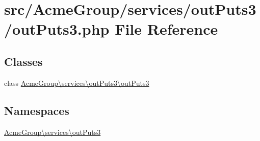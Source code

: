 \hypertarget{services_2out_puts3_2out_puts3_8php}{\section{src/\+Acme\+Group/services/out\+Puts3/out\+Puts3.php File Reference}
\label{services_2out_puts3_2out_puts3_8php}
}
\subsection*{Classes}
\begin{DoxyCompactItemize}
\item 
class \hyperlink{class_acme_group_1_1services_1_1out_puts3_1_1out_puts3}{Acme\+Group\textbackslash{}services\textbackslash{}out\+Puts3\textbackslash{}out\+Puts3}
\end{DoxyCompactItemize}
\subsection*{Namespaces}
\begin{DoxyCompactItemize}
\item 
 \hyperlink{namespace_acme_group_1_1services_1_1out_puts3}{Acme\+Group\textbackslash{}services\textbackslash{}out\+Puts3}
\end{DoxyCompactItemize}
